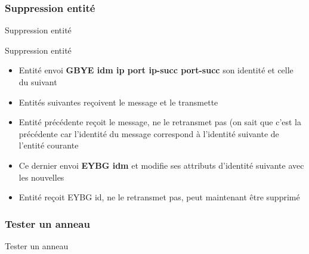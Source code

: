 \documentclass{beamer}
\begin{document}
\subsubsection{Suppression entité}
\begin{frame}
	\begin{center}
		{\Huge Suppression entité}
	\end{center}
\end{frame}

\begin{frame}{Suppression entité}

	\begin{itemize}
		 \item<1-4> Entité envoi \textbf{GBYE idm ip port ip-succ port-succ} son identité et celle du suivant
		 \item<2-4> Entités suivantes reçoivent le message et le transmette
		 \item<3-4> Entité précédente reçoit le message, ne le retransmet pas (on sait que c'est la précédente car l'identité du message correspond à l'identité suivante de l'entité courante
		 \item<3-4> Ce dernier envoi \textbf{EYBG idm} et modifie ses attributs d'identité suivante avec les nouvelles
		 \item<4-4> Entité reçoit EYBG id, ne le retransmet pas, peut maintenant être supprimé
	\end{itemize}
\end{frame}

\subsubsection{Tester un anneau}
\begin{frame}
	\begin{center}
		{\Huge Tester un anneau}
	\end{center}
\end{frame}
\end{document}
